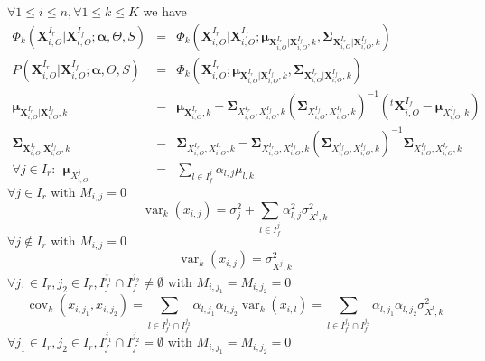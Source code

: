 \documentclass[12pt,a4paper]{report}
\begin{document}
		
		$\forall 1\leq i \leq n, \forall 1\leq k \leq K$ we have
\begin{eqnarray}
		\Phi_k(\boldsymbol{X}^{I_r}_{i,O}|\boldsymbol{X}^{I_f}_{i,O};\boldsymbol{\alpha},\Theta,S)&=&\Phi_k(\boldsymbol{X}^{I_r}_{i,O}|\boldsymbol{X}^{I_f}_{i,O};\boldsymbol{\mu}_{\boldsymbol{X}^{I_r}_{i,O}|\boldsymbol{X}^{I_f}_{i,O},k},\boldsymbol{\Sigma}_{\boldsymbol{X}^{I_r}_{i,O}|\boldsymbol{X}^{I_f}_{i,O},k})\\
				P(\boldsymbol{X}^{I_r}_{i,O}|\boldsymbol{X}^{I_f}_{i,O};\boldsymbol{\alpha},\Theta,S)&=&\Phi_k(\boldsymbol{X}^{I_r}_{i,O};\boldsymbol{\mu}_{\boldsymbol{X}^{I_r}_{i,O}|\boldsymbol{X}^{I_f}_{i,O},k},\boldsymbol{\Sigma}_{\boldsymbol{X}^{I_r}_{i,O}|\boldsymbol{X}^{I_f}_{i,O},k})\\
		\boldsymbol{\mu}_{\boldsymbol{X}^{I_r}_{i,O}|\boldsymbol{X}^{I_f}_{i,O},k}&=& 
				\boldsymbol{\mu}_{\boldsymbol{X}^{I_r}_{i,O},k}+
				\boldsymbol{\Sigma}_{X_{i,O}^{I_r},X_{i,O}^{I_f},k}(\boldsymbol{\Sigma}_{X_{i,O}^{I_f},X_{i,O}^{I_f},k})^{-1}
				( ^t\boldsymbol{X}_{i,O}^{I_f}-\boldsymbol{\mu}_{X^{I_f}_{i,O},k})\\
		\boldsymbol{\Sigma}_{\boldsymbol{X}^{I_r}_{i,O}|\boldsymbol{X}^{I_f}_{i,O},k}&=&\boldsymbol{\Sigma}_{X_{i,O}^{I_r},X_{i,O}^{I_r},k}-\boldsymbol{\Sigma}_{X_{i,O}^{I_r},X_{i,O}^{I_f},k}
		(\boldsymbol{\Sigma}_{X_{i,O}^{I_f},X_{i,O}^{I_f},k})^{-1} \boldsymbol{\Sigma}_{X_{i,O}^{I_f},X_{i,O}^{I_r},k} \\
		\forall j \in I_r: \ \  \boldsymbol{\mu}_{X_{i,O}^{j}}&=&\sum_{l \in I_f^j}\alpha_{l,j}\mu_{l,k} 
\end{eqnarray}		
		$\forall j \in I_r \textrm{ with } M_{i,j}=0$ 
\begin{equation}
	\operatorname{var}_{k}(x_{i,j})=\sigma_{j}^2+ \sum_{l \in I_f^j} \alpha_{l,j}^2\sigma_{X^l,k}^2
\end{equation}			
	$\forall j \notin I_r \textrm{ with } M_{i,j}=0$
\begin{equation}
	\operatorname{var}_{k}(x_{i,j})=\sigma_{X^j,k}^2
\end{equation}			
	$\forall j_1 \in I_r, j_2 \in I_r,I_f^{j_1}\cap I_f^{j_2}\neq \emptyset \textrm{ with } M_{i,j_1}=M_{i,j_2}=0$
	\begin{equation}
	\operatorname{cov}_{k}(x_{i,j_1},x_{i,j_2})=\sum_{l\in I_f^{j_1}\cap I_f^{j_2}}\alpha_{l,j_1}\alpha_{l,j_2}\operatorname{var}_{k}(x_{i,l}) =\sum_{l\in I_f^{j_1}\cap I_f^{j_2}}\alpha_{l,j_1}\alpha_{l,j_2}\sigma_{X^l,k}^2
\end{equation}
	$\forall j_1 \in I_r, j_2 \in I_r,I_f^{j_1}\cap I_f^{j_2}= \emptyset \textrm{ with } M_{i,j_1}=M_{i,j_2}=0$
\end{document}
